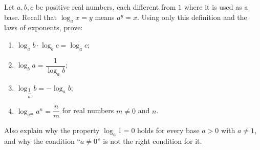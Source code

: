Let $a,b,c$ be positive real numbers, each different from $1$ where it is used as a base. Recall that $\log_ax=y$ means $a^y=x$. Using only this definition and the laws of exponents, prove:
\begin{enumerate}
\item[(a)] $\log_ab\cdot\log_bc=\log_ac$;
\item[(b)] $\log_ba=\dfrac{1}{\log_ab}$;
\item[(c)] $\log_{\dfrac1a}b=-\log_ab$;
\item[(d)] $\log_{a^m}a^n=\dfrac{n}{m}$ for real numbers $m\ne0$ and $n$.
\end{enumerate}
Also explain why the property $\log_a1=0$ holds for every base $a>0$ with $a\ne1$, and why the condition ``$a\ne0$'' is not the right condition for it.
